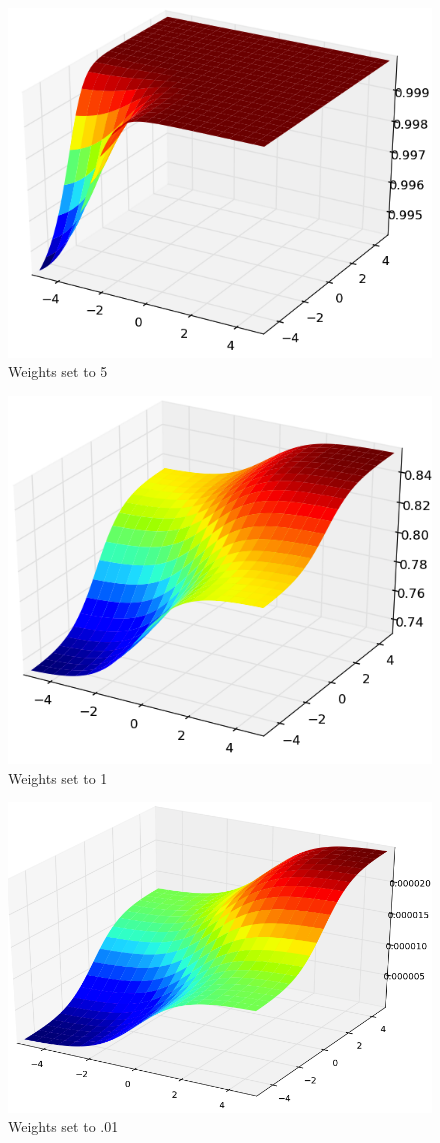\documentclass[12pt]{article}
\begin{document}
    \begin{center}
    \begin{figure}[htb!]
        \includegraphics[width=.7\textwidth]{q9_thres5}
        \caption{Weights set to 5}
    \end{figure}
        \begin{figure}[htb!]
        \includegraphics[width=.7\textwidth]{q9_thres1}
        \caption{Weights set to 1}
    \end{figure}
        \begin{figure}[htb!]
        \includegraphics[width=.7\textwidth]{q9_thres01}
        \caption{Weights set to .01}
    \end{figure}   
    \end{center}  
    
\end{document}
